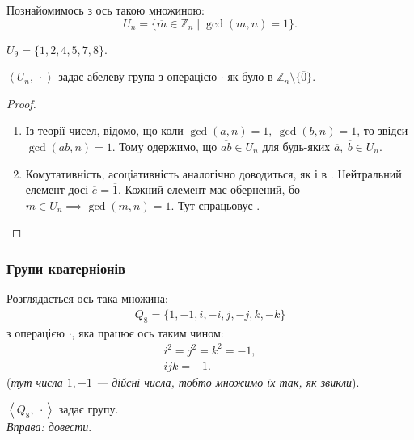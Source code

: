 \documentclass{math_library}
\begin{document}
Познайомимось з ось такою множиною: 
\[ 
U_n = \{ \overline{m} \in \mathbb{Z}_n \mid \gcd(m,n) = 1 \}.
\]

\begin{example}
$U_9 = \{\overline{1},\overline{2},\overline{4},\overline{5},\overline{7},\overline{8} \}$.
\end{example}

\begin{theorem}
$\left<U_n,\ \cdot \right>$ задає абелеву група з операцією $\cdot$ як було в $\mathbb{Z}_n \setminus \{ \overline{0} \}$.
\end{theorem}

\begin{proof}
\begin{enumerate}[nosep,wide=0pt,label={\roman*.}]
\item Із теорії чисел, відомо, що коли $\gcd(a,n) = 1,\ \gcd(b,n) = 1$, то звідси $\gcd(ab,n) = 1$. Тому одержимо, що $\overline{ab} \in U_n$ для будь-яких $\overline{a},\ \overline{b} \in U_n$.

\item Комутативність, асоціативність аналогічно доводиться, як і в . Нейтральний елемент досі $\overline{e} = \overline{1}$. Кожний елемент має обернений, бо $\overline{m} \in U_n \implies \gcd(m,n) = 1$. Тут спрацьовує . \qedhere
\end{enumerate}
\end{proof}

\subsubsection{Групи кватерніонів}
Розглядається ось така множина:
\begin{align*}
Q_8 = \{1,-1,i,-i,j,-j,k,-k\}
\end{align*}
з операцією $\cdot$, яка працює ось таким чином:
\begin{align*}
i^2 = j^2 = k^2 = -1, \\
ijk = -1.
\end{align*}
(\textit{тут числа $1,-1$ --- дійсні числа, тобто множимо їх так, як звикли}).

\begin{theorem}
$\left<Q_8,\ \cdot \right>$ задає групу.\\
\textit{Вправа: довести}.
\end{theorem}
\end{document}
